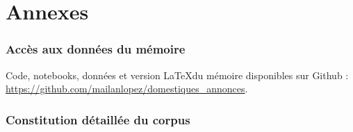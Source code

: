 \part*{Annexes}


\section{Accès aux données du mémoire}

Code, notebooks, données et version \LaTeX du mémoire disponibles sur Github : \url{https://github.com/mailanlopez/domestiques_annonces}.


\newpage
\section{Constitution détaillée du corpus}

